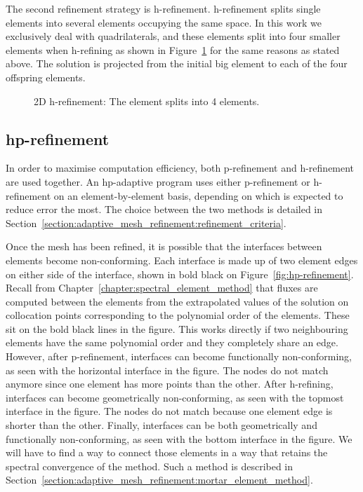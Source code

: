 The second refinement strategy is h-refinement\@. h-refinement splits single elements into several
elements occupying the same space. In this work we exclusively deal with quadrilaterals, and these
elements split into four smaller elements when h-refining as shown in Figure~\ref{fig:h-refinement}
for the same reasons as stated above. The solution is projected from the initial big element to each
of the four offspring elements.

\begin{figure}[H]
    \centering
    
    \caption{2D h-refinement: The element splits into 4 elements.}\label{fig:h-refinement}
\end{figure}

\subsection{hp-refinement}\label{subsection:adaptive_mesh_refinement:refinement_strategies:hp-refinement}

In order to maximise computation efficiency, both p-refinement and h-refinement are used together.
An hp-adaptive program uses either p-refinement or h-refinement on an element-by-element basis,
depending on which is expected to reduce error the most. The choice between the two methods is
detailed in Section~\ref{section:adaptive_mesh_refinement:refinement_criteria}.

Once the mesh has been refined, it is possible that the interfaces between elements become
non-conforming. Each interface is made up of two element edges on either side of the interface,
shown in bold black on Figure~\ref{fig:hp-refinement}. Recall from
Chapter~\ref{chapter:spectral_element_method} that fluxes are computed between the elements from the
extrapolated values of the solution on collocation points corresponding to the polynomial order of
the elements. These sit on the bold black lines in the figure. This works directly if two
neighbouring elements have the same polynomial order and they completely share an edge. However,
after p-refinement, interfaces can become functionally non-conforming, as seen with the horizontal
interface in the figure. The nodes do not match anymore since one element has more points than the
other. After h-refining, interfaces can become geometrically non-conforming, as seen with the
topmost interface in the figure. The nodes do not match because one element edge is shorter than the
other. Finally, interfaces can be both geometrically and functionally non-conforming, as seen with
the bottom interface in the figure. We will have to find a way to connect those elements in a way
that retains the spectral convergence of the method. Such a method is described in
Section~\ref{section:adaptive_mesh_refinement:mortar_element_method}.


